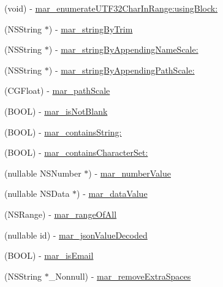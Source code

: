  \begin{DoxyCompactItemize}
\item 
(void) -\/ \hyperlink{category_n_s_string_07_m_a_r_e_x_08_a8a4102c7a10975d5e455e2ee4293e1ce}{mar\+\_\+enumerate\+U\+T\+F32\+Char\+In\+Range\+:using\+Block\+:}
\item 
(N\+S\+String $\ast$) -\/ \hyperlink{category_n_s_string_07_m_a_r_e_x_08_a1e00ce2290fff154167c4a87e22596d5}{mar\+\_\+string\+By\+Trim}
\item 
(N\+S\+String $\ast$) -\/ \hyperlink{category_n_s_string_07_m_a_r_e_x_08_a186dd03ea02c22020befa2ca0f22e45e}{mar\+\_\+string\+By\+Appending\+Name\+Scale\+:}
\item 
(N\+S\+String $\ast$) -\/ \hyperlink{category_n_s_string_07_m_a_r_e_x_08_afc95a802b5918d33f55cdc7641d6e2d5}{mar\+\_\+string\+By\+Appending\+Path\+Scale\+:}
\item 
(C\+G\+Float) -\/ \hyperlink{category_n_s_string_07_m_a_r_e_x_08_a6ac5e754e60f5600cb34bc1932d430af}{mar\+\_\+path\+Scale}
\item 
(B\+O\+OL) -\/ \hyperlink{category_n_s_string_07_m_a_r_e_x_08_a0d6f8208ca5468329bcf2a39a20bf6a0}{mar\+\_\+is\+Not\+Blank}
\item 
(B\+O\+OL) -\/ \hyperlink{category_n_s_string_07_m_a_r_e_x_08_a9e47a9dc32ece0476965b049eb46ea4a}{mar\+\_\+contains\+String\+:}
\item 
(B\+O\+OL) -\/ \hyperlink{category_n_s_string_07_m_a_r_e_x_08_a00c8f34a46386a52983074adc115c858}{mar\+\_\+contains\+Character\+Set\+:}
\item 
(nullable N\+S\+Number $\ast$) -\/ \hyperlink{category_n_s_string_07_m_a_r_e_x_08_ab5ce71ebfc101f42e27ad3c05c5acd15}{mar\+\_\+number\+Value}
\item 
(nullable N\+S\+Data $\ast$) -\/ \hyperlink{category_n_s_string_07_m_a_r_e_x_08_a98e0a13c8a61f86719023356a728e10f}{mar\+\_\+data\+Value}
\item 
(N\+S\+Range) -\/ \hyperlink{category_n_s_string_07_m_a_r_e_x_08_adc243a463b709405b550ff3c4ff43316}{mar\+\_\+range\+Of\+All}
\item 
(nullable id) -\/ \hyperlink{category_n_s_string_07_m_a_r_e_x_08_a352ca5c130970ce27546f804e3a70065}{mar\+\_\+json\+Value\+Decoded}
\item 
(B\+O\+OL) -\/ \hyperlink{category_n_s_string_07_m_a_r_e_x_08_aab8afcd751a3ae6d85e9cd6e2d4fc783}{mar\+\_\+is\+Email}
\item 
(N\+S\+String $\ast$\+\_\+\+Nonnull) -\/ \hyperlink{category_n_s_string_07_m_a_r_e_x_08_a707f5240fb8888606571c4b3c3ca52e8}{mar\+\_\+remove\+Extra\+Spaces}

\end{DoxyCompactItemize}
